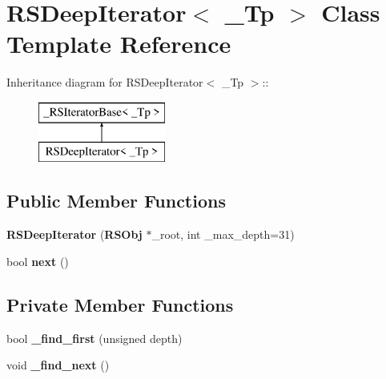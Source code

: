 \section{RSDeepIterator$<$ \_\-Tp $>$ Class Template Reference}
\label{classRSDeepIterator}
Inheritance diagram for RSDeepIterator$<$ \_\-Tp $>$::\begin{figure}[H]
\begin{center}
\leavevmode
\includegraphics[height=2cm]{classRSDeepIterator}
\end{center}
\end{figure}
\subsection*{Public Member Functions}
\begin{DoxyCompactItemize}
\item 
{\bfseries RSDeepIterator} ({\bf RSObj} $\ast$\_\-root, int \_\-max\_\-depth=31)\label{classRSDeepIterator_a16162dbbc162fe7716f6bd74a8d4b2c1}

\item 
bool {\bfseries next} ()\label{classRSDeepIterator_aae0a761b0662e11ce2e2b1c909c6d74f}

\end{DoxyCompactItemize}
\subsection*{Private Member Functions}
\begin{DoxyCompactItemize}
\item 
bool {\bfseries \_\-find\_\-first} (unsigned depth)\label{classRSDeepIterator_ac7293f782dda57e237f51f389ee58fa5}

\item 
void {\bfseries \_\-find\_\-next} ()\label{classRSDeepIterator_ac7c7e863c1e7a867c66a45e81cd948cb}

\end{DoxyCompactItemize}
